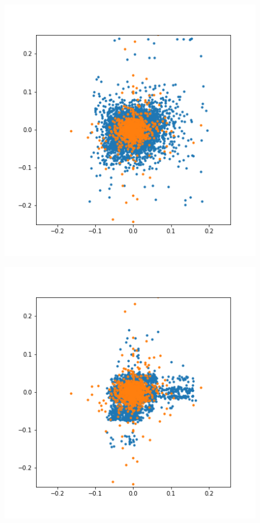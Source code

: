 \documentclass{article}
\begin{document}
\begin{figure}[!ht]
\begin{center}
\begin{minipage}{.33\linewidth}
            \label{fig:gen_t_copula}
        \end{minipage}
        \begin{minipage}{.33\linewidth}
            \centering
            \includegraphics[width=\textwidth]{pics/gen_t_copulaKDE.png}
            \label{fig:gen_t_copulaKDE}
        \end{minipage}%
        \begin{minipage}{.33\linewidth}
            \centering
            \includegraphics[width=\textwidth]{pics/gen_tgan.png}

\end{minipage}
\end{center}
\end{figure}
\end{document}
